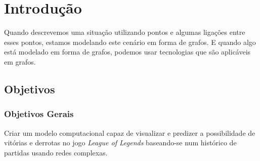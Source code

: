 \chapter{Introdução}
\label{chap:Introducao}

Quando descrevemos uma situação utilizando pontos e algumas ligações entre esses pontos, estamos modelando este cenário em forma de grafos. E quando algo está modelado em forma de grafos, podemos usar tecnologias que são aplicáveis em grafos.









\section{Objetivos}

\subsection{Objetivos Gerais}
Criar um modelo computacional capaz de visualizar e predizer a possibilidade de vitórias e derrotas no jogo \textit{League of Legends} baseando-se num histórico de partidas usando redes complexas.


